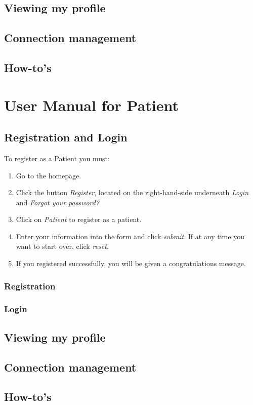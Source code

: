 \documentclass[12pt]{report}
\begin{document}
\section{Viewing my profile}
\section{Connection management}
\section{How-to's}

\chapter{User Manual for Patient}
\section{Registration and Login}
To register as a Patient you must:
\begin{enumerate}
\item Go to the homepage.
\item Click the button \textit{Register}, located on the right-hand-side underneath \textit{Login} and \textit{Forgot your password?}
\item Click on \textit{Patient} to register as a patient.
\item Enter your information into the form and click \textit{submit}. If at any time you want to start over, click \textit{reset}.
\item If you registered successfully, you will be given a congratulations message.
\end{enumerate}
\subsection{Registration}
\subsection{Login}
\section{Viewing my profile}
\section{Connection management}
\section{How-to's}
\end{document}
